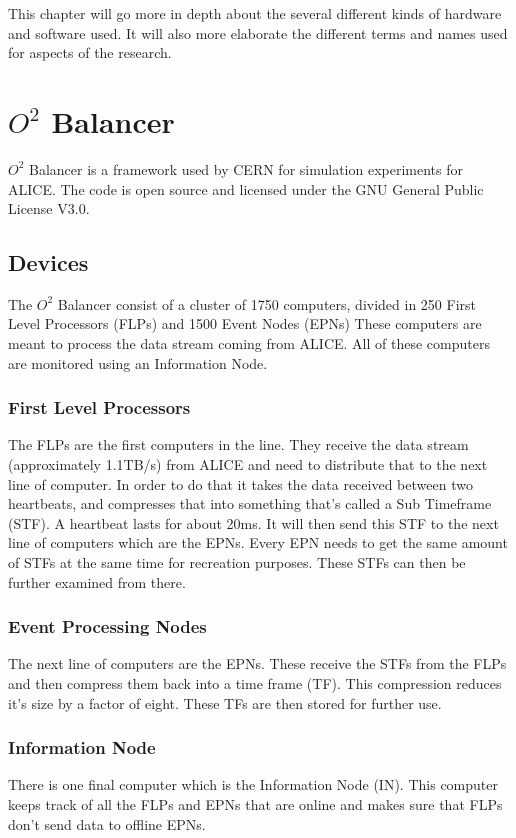 This chapter will go more in depth about the several different kinds of hardware and software used. It will also more elaborate the different terms and names used for aspects of the research.
\section{$O^2$ Balancer}
$O^2$ Balancer is a framework used by CERN for simulation experiments for ALICE. The code is open source and licensed under the GNU General Public License V3.0.

\subsection{Devices}
The $O^2$ Balancer consist of a cluster of 1750 computers, divided in 250 First Level Processors (FLPs) and 1500 Event  Nodes (EPNs) These computers are meant to process the data stream coming from ALICE. All of these computers are monitored using an Information Node.

\subsubsection*{First Level Processors}
The FLPs are the first computers in the line. They receive the data stream (approximately 1.1TB/s) from ALICE and need to distribute that to the next line of computer. In order to do that it takes the data received between two heartbeats, and compresses that into something that's called a Sub Timeframe (STF). A heartbeat lasts for about 20ms. It will then send this STF to the next line of computers which are the EPNs. Every EPN needs to get the same amount of STFs at the same time for recreation purposes. These STFs can then be further examined from there.

\subsubsection*{Event Processing Nodes}
The next line of computers are the EPNs. These receive the STFs from the FLPs and then compress them back into a time frame (TF). This compression reduces it's size by a factor of eight. These TFs are then stored for further use.

\subsubsection*{Information Node}
There is one final computer which is the Information Node (IN). This computer keeps track of all the FLPs and EPNs that are online and makes sure that FLPs don't send data to offline EPNs.

